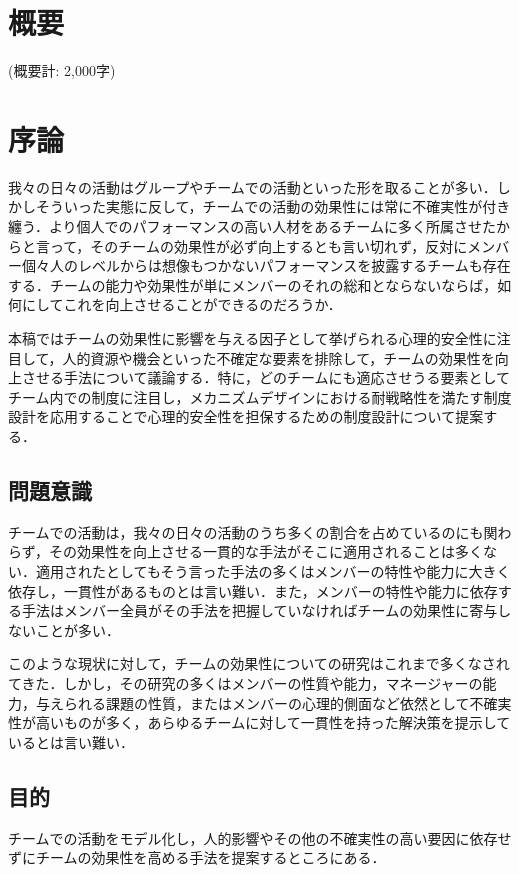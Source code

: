\documentclass[a4paper, 11pt]{jsarticle}
\begin{document}
\maketitle

\hspace{0pt}
\vfill
\tableofcontents
\thispagestyle{empty}
\vfill
\hspace{0pt}
\newpage
\section*{概要}
(概要計: 2,000字) 
\section{序論}
我々の日々の活動はグループやチームでの活動といった形を取ることが多い．しかしそういった実態に反して，チームでの活動の効果性には常に不確実性が付き纏う．より個人でのパフォーマンスの高い人材をあるチームに多く所属させたからと言って，そのチームの効果性が必ず向上するとも言い切れず，反対にメンバー個々人のレベルからは想像もつかないパフォーマンスを披露するチームも存在する．チームの能力や効果性が単にメンバーのそれの総和とならないならば，如何にしてこれを向上させることができるのだろうか．

本稿ではチームの効果性に影響を与える因子として挙げられる心理的安全性に注目して，人的資源や機会といった不確定な要素を排除して，チームの効果性を向上させる手法について議論する．特に，どのチームにも適応させうる要素としてチーム内での制度に注目し，メカニズムデザインにおける耐戦略性を満たす制度設計を応用することで心理的安全性を担保するための制度設計について提案する．
\subsection{問題意識}
チームでの活動は，我々の日々の活動のうち多くの割合を占めているのにも関わらず，その効果性を向上させる一貫的な手法がそこに適用されることは多くない．適用されたとしてもそう言った手法の多くはメンバーの特性や能力に大きく依存し，一貫性があるものとは言い難い．また，メンバーの特性や能力に依存する手法はメンバー全員がその手法を把握していなければチームの効果性に寄与しないことが多い．

このような現状に対して，チームの効果性についての研究はこれまで多くなされてきた．しかし，その研究の多くはメンバーの性質や能力，マネージャーの能力，与えられる課題の性質，またはメンバーの心理的側面など依然として不確実性が高いものが多く，あらゆるチームに対して一貫性を持った解決策を提示しているとは言い難い．
\subsection{目的}
チームでの活動をモデル化し，人的影響やその他の不確実性の高い要因に依存せずにチームの効果性を高める手法を提案するところにある．
\end{document}
